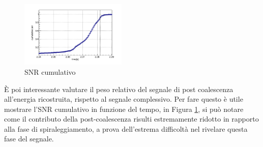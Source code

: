 \begin{figure}
	\vspace{-10pt}
	\begin{center}
		\includegraphics[width=0.45\textwidth]{figures/Capitolo_3/dump/1/V1_snr_cum_SHTdfdt_296.png}
	\end{center}
	\vspace{-8pt}
	\caption{SNR cumulativo}
	\label{fig:snr_cum}
	\vspace{-10pt}
\end{figure}
È poi interessante valutare il peso relativo del segnale di post coalescenza all'energia ricostruita, rispetto al segnale complessivo. Per fare questo è utile mostrare l'SNR cumulativo in funzione del tempo, in Figura \ref{fig:snr_cum}, si può notare come il contributo della post-coalescenza risulti estremamente ridotto in rapporto alla fase di spiraleggiamento, a prova dell'estrema difficoltà nel rivelare questa fase del segnale.

